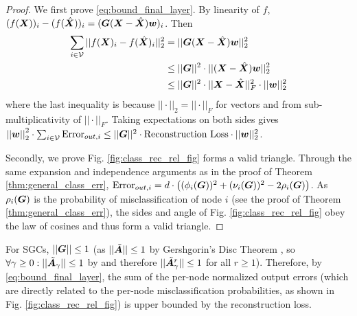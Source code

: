 \begin{proof}
    We first prove \eqref{eq:bound_final_layer}. %
    By linearity of $f$, $(f(\bm{X}))_i - (f(\hat{\bm{X}}))_i = (\bm{G}(\bm{X} - \hat{\bm{X}})\bm{w})_{i}$. Then 
    \begin{align}
    \sum_{i \in \mathcal{V}} ||f(\bm{X})_{i} - f(\hat{\bm{X}})_{i} ||_{2}^{2} &= ||\bm{G}(\bm{X} - \hat{\bm{X}})\bm{w}||_{2}^{2} \\
    &\leq ||\bm{G}||^{2}\cdot ||(\bm{X} - \hat{\bm{X}})\bm{w}||_{2}^{2} \\ 
    &\leq ||\bm{G}||^{2} \cdot ||\bm{X} - \hat{\bm{X}}||_{F}^{2} \cdot ||\bm{w}||_{2}^{2} 
    \end{align}
    where the last inequality is because $||\cdot||_{2} = ||\cdot||_{F}$ for vectors and from sub-multiplicativity of $||\cdot||_{F}$. Taking expectations on both sides gives $ \left\lvert\left\lvert\bm{w}\right\rvert\right\rvert^{2}_{2} \cdot \sum_{i \in \mathcal{V}} \text{Error}_{out,i} \leq ||\bm{G}||^{2} \cdot  \text{Reconstruction Loss} \cdot ||\bm{w}||_{2}^{2}$. 
    

    Secondly, we prove Fig. \ref{fig:class_rec_rel_fig} forms a valid triangle. Through the same expansion and independence arguments as in the proof of Theorem \ref{thm:general_class_err}, $\text{Error}_{out,i} = d\cdot \left((\phi_{i}(\bm{G}))^{2} + (\nu_{i}(\bm{G}))^{2} - 2\rho_{i}(\bm{G}) \right)$. As $\rho_{i}(\bm{G})$ is the probability of misclassification of node $i$ (see the proof of Theorem \ref{thm:general_class_err}), the sides and angle of Fig. \ref{fig:class_rec_rel_fig} obey the law of cosines and thus form a valid triangle.
\end{proof}


For SGCs, $||\bm{G}|| \leq 1$ (as $||\tilde{\bm{A}}|| \leq 1$ by Gershgorin's Disc Theorem \cite{horn-and-johnson}, so $\forall \gamma\geq 0:||\tilde{\bm{A}}_{\gamma}|| \leq 1$ by \cite[Theorem 1]{wu2019simplifying} and therefore $||\tilde{\bm{A}}_{\gamma}^{r}|| \leq 1$ for all $r \geq 1$). Therefore, by \eqref{eq:bound_final_layer}, the sum of the per-node normalized output errors (which are directly related to the per-node misclassification probabilities, as shown in Fig. \ref{fig:class_rec_rel_fig}) is upper bounded by the reconstruction loss.

